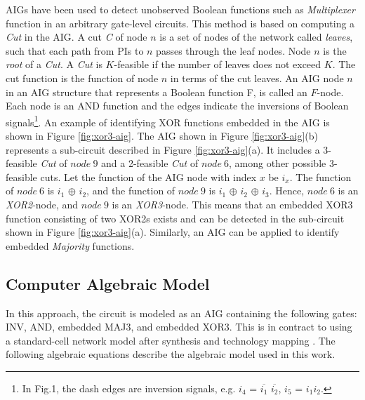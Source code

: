 AIGs have been used to detect unobserved Boolean functions such as \textit{Multiplexer} function \cite{cunxiyu:dac16} in an arbitrary gate-level circuits. This method is based on computing a \textit{Cut} in the AIG. A cut \textit{C} of node $n$ is a set of nodes of the network called \textit{leaves}, such that each path from PIs to $n$ passes through the leaf nodes. Node $n$ is the \textit{root} of a \textit{Cut}. A \textit{Cut} is $K$-feasible if the number of leaves does not exceed $K$. The cut function is the function of node $n$ in terms of the cut leaves. An AIG node $n$ in an AIG structure that represents a Boolean function F, is called an $F$-node. Each node is an AND function and the edges indicate the inversions of Boolean signals\footnote{In Fig.1, the dash edges are inversion signals, e.g. $i_4$ = $\overline{i_1}$  $\overline{i_2}$, $i_5$ = $i_1$$i_2$.}. 
%
An example of identifying XOR functions embedded in the AIG is shown in Figure \ref{fig:xor3-aig}. The AIG shown in Figure \ref{fig:xor3-aig}(b) represents a sub-circuit described in Figure \ref{fig:xor3-aig}(a). It includes a 3-feasible \textit{Cut} of $node~9$ and a 2-feasible \textit{Cut} of $node~6$, among other possible 3-feasible cuts. {\color{red} Let the function of the AIG node with index $x$ be $i_{x}$. }
The function of $node~6$ is $i_1$ $\oplus$ $i_2$, and the function of $node~9$ is $i_1$ $\oplus$ $i_2$ $\oplus$ $i_3$. Hence, $node~6$ is an \textit{XOR2}-node, and $node~9$ is an \textit{XOR3}-node. This means that an embedded XOR3 function consisting of two XOR2s exists and can be detected in the sub-circuit shown in Figure \ref{fig:xor3-aig}(a). Similarly, an AIG can be applied to identify embedded \textit{Majority} functions.


\subsection{Computer Algebraic Model}

In this approach, the circuit is modeled as an AIG containing the following gates: INV, AND, embedded MAJ3, and embedded XOR3. This is in contract to using a standard-cell network model after synthesis and technology mapping \cite{ciesielski2015verification}. The following algebraic equations describe the algebraic model used in this work.




